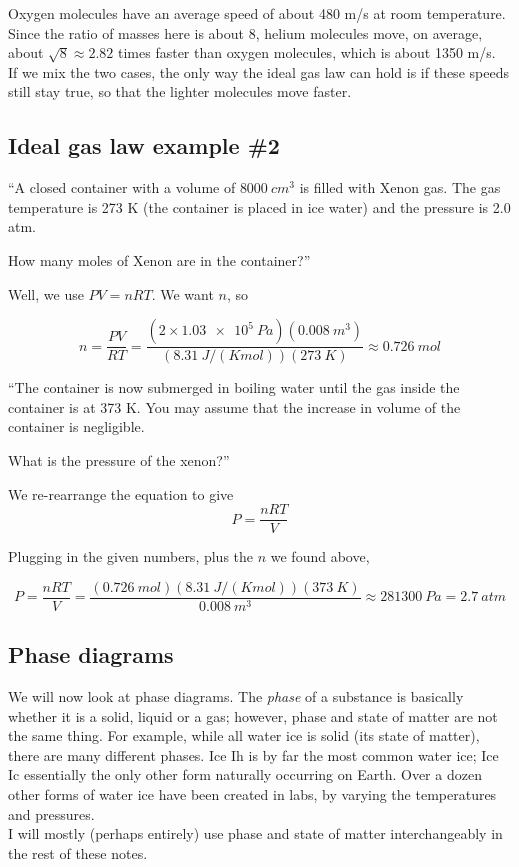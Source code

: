 Oxygen molecules have an average speed of about 480 m/s at room temperature. Since the ratio of masses here is about 8, helium molecules move, on average, about $\sqrt{8} \approx 2.82$ times faster than oxygen molecules, which is about 1350 m/s.\\
If we mix the two cases, the only way the ideal gas law can hold is if these speeds still stay true, so that the lighter molecules move faster.

\subsection{Ideal gas law example \#2}

``A closed container with a volume of $\SI{8000}{cm^3}$ is filled with Xenon gas. The gas temperature is 273 K (the container is placed in ice water) and the pressure is 2.0 atm.

How many moles of Xenon are in the container?''

Well, we use $P V = n R T$. We want $n$, so

\begin{equation}
n = \frac{PV}{RT} = \frac{(2\times\SI{1.03e5}{Pa})(\SI{0.008}{m^3})}{(\SI{8.31}{J/(K mol)})(\SI{273}{K})} \approx \SI{0.726}{mol}
\end{equation}

``The container is now submerged in boiling water until the gas inside the container is at 373 K. You may assume that the increase in volume of the container is negligible.

What is the pressure of the xenon?''

We re-rearrange the equation to give
\begin{equation}
P = \frac{n R T}{V}
\end{equation}

Plugging in the given numbers, plus the $n$ we found above,

\begin{equation}
P = \frac{n R T}{V} = \frac{ (\SI{0.726}{mol})(\SI{8.31}{J/(K mol)})(\SI{373}{K})}{\SI{0.008}{m^3}} \approx \SI{281300}{Pa} = \SI{2.7}{atm}
\end{equation}

\subsection{Phase diagrams}

We will now look at phase diagrams. The \emph{phase} of a substance is basically whether it is a solid, liquid or a gas; however, phase and state of matter are not the same thing. For example, while all water ice is solid (its state of matter), there are many different phases. Ice Ih is by far the most common water ice; Ice Ic essentially the only other form naturally occurring on Earth. Over a dozen other forms of water ice have been created in labs, by varying the temperatures and pressures.\\
I will mostly (perhaps entirely) use phase and state of matter interchangeably in the rest of these notes.

